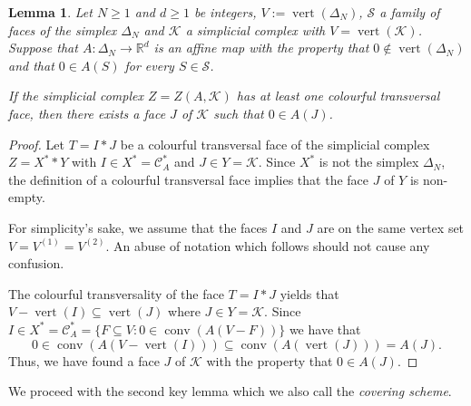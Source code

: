 \documentclass[a4paper,11pt,reqno, english]{amsart}
\newtheorem{lemma}[theorem]{Lemma}
\theoremstyle{definition}
\theoremstyle{remark}
\newcommand\R{\mathbb R}
\newcommand\CC{\mathscr C}
\DeclareMathOperator{\vertex}{\mathrm{vert}}
\DeclareMathOperator{\conv}{\mathrm{conv}}
\begin{document}
\medskip
\begin{lemma}\label{lem : affine CS/TM scheme caratheodory}
	Let $N\geq 1$ and $d\geq 1$ be integers, $V:=\vertex(\Delta_N)$, $\mathcal{S}$ a family of faces of the simplex $\Delta_N$ and $\mathcal{K}$ a simplicial complex with $V=\vertex(\mathcal{K})$.
	Suppose that $A\colon\Delta_N\longrightarrow\R^d$ is an affine map with the property that $0\notin \vertex(\Delta_N)$ and that $0\in A(S)$ for every $S\in \mathcal{S}$.

	\smallskip\noindent
	If the simplicial complex $Z=Z(A,\mathcal{K})$ has at least one colourful transversal face, then there exists a face $J$ of $\mathcal{K}$ such that $0\in A(J)$.
\end{lemma}
\begin{proof}
	Let $T=I*J$ be a colourful transversal face of the simplicial complex $Z=X^**Y$ with $I\in X^*=\CC_A^*$ and $J\in Y=\mathcal{K}$.
	Since $X^*$ is not the simplex $\Delta_N$, the definition of a colourful transversal face implies that the face $J$ of $Y$ is non-empty.

	\medskip
	For simplicity's sake, we assume that the faces $I$ and $J$ are on the same vertex set $V=V^{(1)}=V^{(2)}$.
	An abuse of notation which follows should not cause any confusion.

	\medskip
	The colourful transversality of the face $T=I*J$ yields that $V- \vertex(I) \subseteq  \vertex(J)$ where $J\in Y =\mathcal{K}$.
	Since $I\in  X^*=\CC_A^*= \{ F\subseteq V : 0\in \conv(A(V-F)) \}$ we have that
	\[
		0\in \conv(A(V- \vertex(I)))\subseteq \conv (A( \vertex(J)))=A(J).
	\]
	Thus, we have found a face $J$ of $\mathcal{K}$ with the property that $0\in A(J)$.
\end{proof}



\medskip
We proceed with the second key lemma which we also call the {\em covering scheme}.
\end{document}
